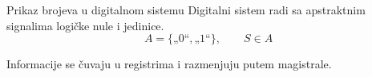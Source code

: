 \begin{frame}[label=04-s021]{Prikaz brojeva u digitalnom sistemu}
Digitalni sistem radi sa apstraktnim signalima logičke nule i jedinice.
\[A=\{\text{„0“},\text{„1“}\},\qquad S\in A\]
\par\vspace{2mm}
\begin{center}\end{center}
\par\vspace{2mm}
\centering Informacije se čuvaju u registrima i razmenjuju putem magistrale.
\end{frame}
